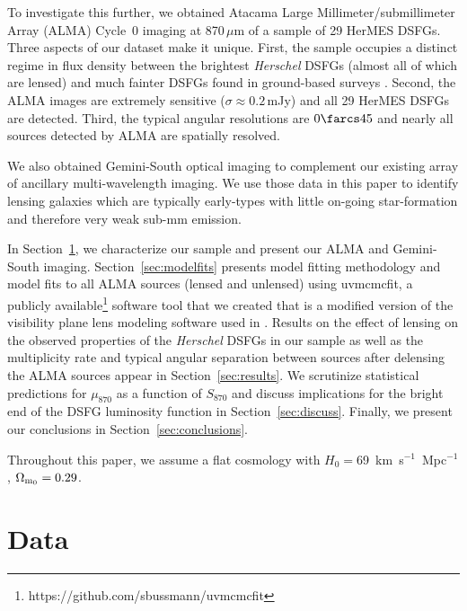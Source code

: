 \documentclass[iop]{emulateapj}
\begin{document}
To investigate this further, we obtained Atacama Large Millimeter/submillimeter
Array (ALMA) Cycle~0 imaging at 870$\,\mu$m of a sample of 29 HerMES DSFGs.
Three aspects of our dataset make it unique.  First, the sample occupies a
distinct regime in flux density between the brightest {\it Herschel} DSFGs
(almost all of which are lensed) and much fainter DSFGs found in ground-based
surveys \citep[most of which are expected to be unlensed;
e.g.,][]{Hodge:2013qy}.  Second, the ALMA images are extremely sensitive
($\sigma \approx 0.2\,$mJy) and all 29 HerMES DSFGs are detected.  Third, the
typical angular resolutions are $0\farcs45$ and nearly all sources detected by
ALMA are spatially resolved.

We also obtained Gemini-South optical imaging to complement our existing array
of ancillary multi-wavelength imaging.  We use those data in this paper to
identify lensing galaxies which are typically early-types with little on-going
star-formation and therefore very weak sub-mm emission.

In Section~\ref{sec:obs}, we characterize our sample and present our ALMA and
Gemini-South imaging.  Section~\ref{sec:modelfits} presents model fitting
methodology and model fits to all ALMA sources (lensed and unlensed) using {\sc
uvmcmcfit}, a publicly
available\footnote{https://github.com/sbussmann/uvmcmcfit} software tool that
we created that is a modified version of the visibility plane lens modeling
software used in \citet{Bussmann:2013lr}.  Results on the effect of lensing on
the observed properties of the {\it Herschel} DSFGs in our sample as well as
the multiplicity rate and typical angular separation between sources after
delensing the ALMA sources appear in Section~\ref{sec:results}.  We scrutinize
statistical predictions for $\mu_{870}$ as a function of $S_{870}$ and discuss
implications for the bright end of the DSFG luminosity function in
Section~\ref{sec:discuss}.  Finally, we present our conclusions in
Section~\ref{sec:conclusions}.

Throughout this paper, we assume a flat cosmology with
$H_0=$69~km~s$^{-1}$~Mpc$^{-1}$, $\Omega_{\rm m_0} = 0.29$.

\section{Data}\label{sec:obs}
\end{document}
